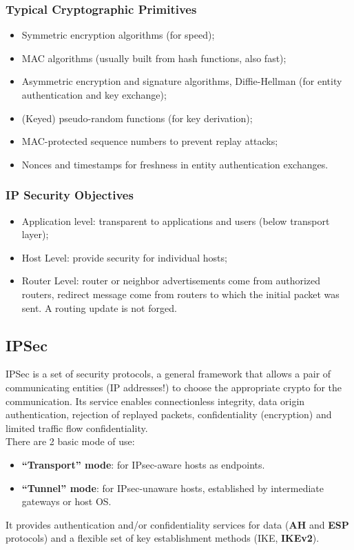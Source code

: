 \documentclass[a4paper, 10pt, titlepage]{article}
\begin{document}
\subsubsection*{Typical Cryptographic Primitives}
\begin{itemize}
	\item Symmetric encryption algorithms (for speed);
	\item MAC algorithms (usually built from hash functions, also fast);
	\item Asymmetric encryption and signature algorithms, Diffie-Hellman (for entity authentication and key exchange);
	\item (Keyed) pseudo-random functions (for key derivation);
	\item MAC-protected sequence numbers to prevent replay attacks;
	\item Nonces and timestamps for freshness in entity authentication exchanges.
\end{itemize}

\subsubsection*{IP Security Objectives}
\begin{itemize}
	\item Application level: transparent to applications and users (below transport layer);
	\item Host Level: provide security for individual hosts;
	\item Router Level: router or neighbor advertisements come from authorized routers, redirect message come from routers to which the initial packet was sent. A routing update is not forged.
\end{itemize}

\subsection{IPSec}
IPSec is a set of security protocols, a general framework that allows a pair of communicating entities (IP addresses!) to choose the appropriate crypto for the communication. Its service enables connectionless integrity, data origin authentication, rejection of replayed packets, confidentiality (encryption) and limited traffic flow confidentiality. \medskip\\
There are 2 basic mode of use:
\begin{itemize}
	\item \textbf{“Transport” mode}: for IPsec-aware hosts as endpoints.
	\item \textbf{“Tunnel” mode}: for IPsec-unaware hosts, established by intermediate gateways or host OS.
\end{itemize}
It provides authentication and/or confidentiality services for data (\textbf{AH} and \textbf{ESP} protocols) and a flexible set of key establishment methods (IKE, \textbf{IKEv2}).
\end{document}
